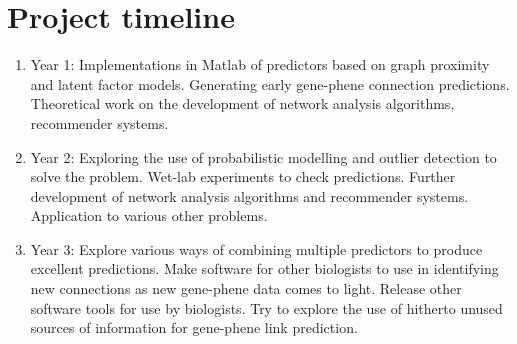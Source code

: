 \documentclass[11pt]{article}
\begin{document}
\section{Project timeline}
\begin{enumerate}
 \item Year 1: Implementations in Matlab of predictors based on graph proximity and latent factor models. Generating early gene-phene connection predictions. Theoretical work on the development of network analysis algorithms, recommender systems.
 \item Year 2:  Exploring the use of probabilistic modelling and outlier detection to solve the problem. Wet-lab experiments to check predictions. Further development of network analysis algorithms and recommender systems. Application to various other problems.
 \item Year 3: Explore various ways of combining multiple predictors to produce excellent predictions. Make software for other biologists to use in identifying new connections as new gene-phene data comes to light. Release other software tools for use by biologists. Try to explore the use of hitherto unused sources of information for gene-phene link prediction.
\end{enumerate}




\end{document}

